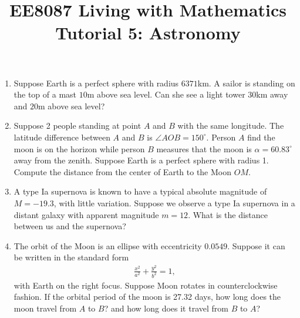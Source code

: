 \documentclass{article}
\title{EE8087 Living with Mathematics\\Tutorial 5: Astronomy}
\date{}
\begin{document}
 \maketitle
\begin{enumerate}
\item Suppose Earth is a perfect sphere with radius $6371$km. A sailor is standing on the top of a mast $10$m above sea level. Can she see a light tower $30$km away and $20$m above sea level?


\item Suppose 2 people standing at point $A$ and $B$ with the same longitude. The latitude difference between $A$ and $B$ is $\angle AOB = 150^\circ$. Person $A$ find the moon is on the horizon while person $B$ measures that the moon is $\alpha = 60.83^\circ$ away from the zenith. Suppose Earth is a perfect sphere with radius 1. Compute the distance from the center of Earth to the Moon $OM$.
\begin{figure}[ht]
  \centering
\end{figure}
\item A type Ia supernova is known to have a typical absolute magnitude of $M = -19.3$, with little variation. Suppose we observe a type Ia supernova in a distant galaxy with apparent magnitude $m=12$. What is the distance between us and the supernova?
\item  The orbit of the Moon is an ellipse with eccentricity $0.0549$. Suppose it can be written in the standard form
  \begin{align*}
    \frac{x^2}{a^2}+\frac{y^2}{b^2} = 1,
  \end{align*}
   with Earth on the right focus. Suppose Moon rotates in counterclockwise fashion. If the orbital period of the moon is 27.32 days, how long does the moon travel from $A$ to $B$? and how long does it travel from $B$ to $A$?

  \begin{figure}[ht]
    \centering
\end{figure}
\end{enumerate}
\end{document}
